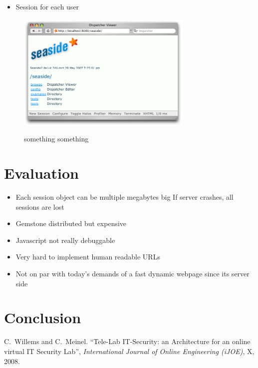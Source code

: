 \documentclass[a4paper,12pt,pagesize,headsepline,bibtotoc,titlepage]{scrartcl}
\begin{document}
\begin{itemize}
\item Session for each user
\end{itemize}

\begin{figure}[hbp]
\begin{center}
\includegraphics*[width=0.75\textwidth]{images/toolbar.png}\\
\caption{something something}
\label{abb:test}
\end{center}
\end{figure}

\section{Evaluation}
\label{sec:evaluation}

\begin{itemize}
\item Each session object can be multiple megabytes big If server crashes, all sessions are lost
\item Gemstone distributed but expensive
\item Javascript not really debuggable
\item Very hard to implement human readable URLs
\item Not on par with today’s demands of a fast dynamic webpage since its server side
\end{itemize}

\section{Conclusion}
\label{sec:conclusion}



\newpage
\begin{thebibliography}{1}

C.~Willems and C.~Meinel.
``Tele-Lab IT-Security: an Architecture for an online virtual IT Security Lab'',
\emph{International Journal of Online Engineering (iJOE)},
X, 2008.

\end{thebibliography}
\end{document}
